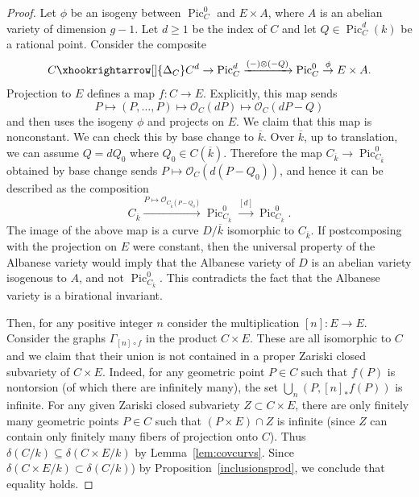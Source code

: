 \documentclass[a4paper,11pt]{amsart}
\theoremstyle{plain}
\theoremstyle{remark}
\newcommand{\Pic}{\operatorname{Pic}}
\newcommand{\dendegs}{\delta}
\begin{document}
\begin{proof}
    Let $\phi$ be an isogeny between $\Pic^0_C$ and $E\times A$, where $A$ is an abelian variety of dimension $g-1$. 
    Let \(d \geq 1\) be the index
    of \(C\) and let \(Q \in \Pic^d_C(k)\) be a rational point.  Consider the composite
    \[
        C \xhookrightarrow[]{ \Delta_C } C^{d} \to  \Pic^{d}_C  \xrightarrow[]{(-) \otimes (-Q)}\Pic_C^0  \overset{\phi}{\to}E\times A.
    \]
    Projection to \(E\) defines a map $f:C\to E$.  
    Explicitly, this map sends 
    \[
    P\mapsto (P,\dots,P)\mapsto \mathcal{O}_C(dP) \mapsto \mathcal{O}_C(dP-Q)
    \]
    and then uses the isogeny $\phi$ and projects on $E$. We claim that this map is nonconstant. We can check this by base change to $\overline{k}$. 
    Over $\overline{k}$, up to translation, we can assume $Q=dQ_0$ where $Q_0\in C(\overline{k})$.
    Therefore the map $C_{\overline{k}}\to \Pic^0_{C_{\overline{k}}}$ obtained by base change sends $P\mapsto \mathcal{O}_C(d(P-Q_0))$, and hence it
     can be described as the composition
    \[
    C_{\overline{k}} \xrightarrow{P\mapsto \mathcal{O}_{C_{\overline{k}}(P-Q_0)} } \Pic_{C_{\overline{k}}}^0 \overset{[d]}{\to} \Pic^0_{C_{\overline{k}}}. 
    \] The image of the above map is a curve $D/\overline{k}$ isomorphic to $C_{\overline{k}}$.  If postcomposing with the projection on $E$ were constant, then the universal property of the Albanese variety would imply that the Albanese variety of $D$ is an abelian variety isogenous to $A$, and not $\Pic^0_{C_{\overline{k}}}$. This contradicts the fact that the Albanese variety is a birational invariant.
    
    Then, for any positive integer $n$ consider the multiplication $[n]: E \to E$.
    Consider the graphs $\Gamma_{[n]\circ f}$ in the product $ C\times E$. These are all isomorphic to $C$ and we claim that their union is not contained in a proper Zariski closed subvariety of \(C \times E\).  Indeed, for any geometric point \(P \in C\) such that \(f(P)\) is nontorsion (of which there are infinitely many), the set \(\bigcup_n (P, [n]_* f(P))\) is infinite.  For any given Zariski closed subvariety \(Z \subset C \times E\), there are only finitely many geometric points \(P \in C\) such that \((P \times E)\cap Z\) is infinite (since \(Z\) can contain only finitely many fibers of projection onto \(C\)).  Thus $\dendegs(C/k)\subseteq \dendegs(C\times E/k)$ by Lemma~\ref{lem:covcurvs}.  Since \(\dendegs(C\times E/k) \subset \dendegs(C/k)\)) by Proposition~\ref{inclusionsprod}, we conclude that equality holds.
\end{proof}
\end{document}
